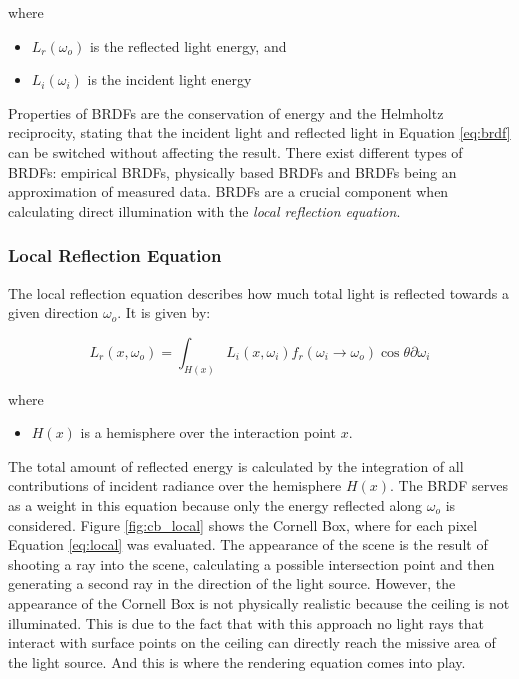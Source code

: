 \noindent where
\begin{itemize}
	\setlength\itemsep{0.05em}
	\item  $L_{r}(\omega_{o})$ is the reflected light energy, and
	\item  $L_{i}(\omega_{i})$ is the incident light energy
\end{itemize}

Properties of BRDFs are the conservation of energy and the Helmholtz reciprocity, stating that the incident light and reflected light in Equation \ref{eq:brdf} can be switched without affecting the result. There exist different types of BRDFs: empirical BRDFs, physically based BRDFs and BRDFs being an approximation of measured data.
BRDFs are a crucial component when calculating direct illumination with the \emph{local reflection equation}.

\subsubsection{Local Reflection Equation}

The local reflection equation describes how much total light is reflected towards a given direction $\omega_{o}$. It is given by:

\begin{equation}\label{eq:local}
L_{r}(x, \omega_{o}) = \int_{H(x)} L_{i}(x, \omega_{i})f_{r}(\omega_{i} \rightarrow \omega_{o})\cos\theta\partial\omega_{i}
\end{equation}

\noindent where
\begin{itemize}
	\setlength\itemsep{0.05em}
	\item  $H(x)$ is a hemisphere over the interaction point $x$.
\end{itemize}

The total amount of reflected energy is calculated by the integration of all contributions of incident radiance over the hemisphere $H(x)$. The BRDF serves as a weight in this equation because only the energy reflected along $\omega_{o}$ is considered.
Figure \ref{fig:cb_local} shows the Cornell Box, where for each pixel Equation \ref{eq:local} was evaluated. The appearance of the scene is the result of shooting a ray into the scene, calculating a possible intersection point and then generating a second ray in the direction of the light source. However, the appearance of the Cornell Box is not physically realistic because the ceiling is not illuminated. This is due to the fact that with this approach no light rays that interact with surface points on the ceiling can directly reach the missive area of the light source. And this is where the rendering equation comes into play. 
 
